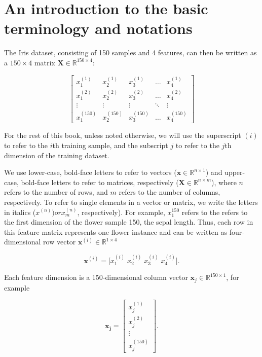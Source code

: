 \documentclass[letterpaper]{report}
\begin{document}
\section{An introduction to the basic terminology and notations}

\newpage

The Iris dataset, consisting of 150 samples and 4 features, can then be written as a $150 \times 4$ matrix $\mathbf{X} \in \mathbb{R}^{150 \times 4}:$

\[
\begin{bmatrix}
    x_{1}^{(1)} & x_{2}^{(1)} & x_{3}^{(1)} & \dots  & x_{4}^{(1)} \\
    x_{1}^{(2)} & x_{2}^{(2)} & x_{3}^{(2)} & \dots  & x_{4}^{(2)} \\
    \vdots & \vdots & \vdots & \ddots & \vdots \\
    x_{1}^{(150)} & x_{2}^{(150)} & x_{3}^{(150)} & \dots  & x_{4}^{(150)}
\end{bmatrix}
\]

For the rest of this book, unless noted otherwise, we will use the superscript $(i)$ to refer to the $i$th training sample, and the subscript $j$ to refer to the $j$th dimension of the training dataset. 

We use lower-case, bold-face letters to refer to vectors ($\mathbf{x} \in \mathbb{R}^{n \times 1}$) and upper-case, bold-face letters to refer to matrices, respectively ($\mathbf{X} \in \mathbb{R}^{n \times m}$), where $n$ refers to the number of rows, and $m$ refers to the number of columns, respectively. To refer to single elements in a vector or matrix, we write the letters in italics ($x^{(n)}) or x^{(n)}_{m}$, respectively). For example, $x^{150}_1$ refers to the refers to the first dimension of the flower sample 150, the sepal length. Thus, each row in this feature matrix represents one flower instance and can be written as four-dimensional row vector $\mathbf{x}^{(i)} \in \mathbb{R}^{1 \times 4}$

\[ \mathbf{x}^{(i)} = \bigg[x^{(i)}_1 \; x^{(i)}_2 \; x^{(i)}_3 \; x^{(i)}_4 \bigg]. \]

Each feature dimension is a 150-dimensional column vector $\mathbf{x}_{j} \in \mathbb{R}^{150 \times 1}$, for example

\[
\mathbf{x_j} = \begin{bmatrix}
    x_{j}^{(1)}  \\
    x_{j}^{(2)}  \\
    \vdots  \\
    x_{j}^{(150)}
\end{bmatrix}
.\]
\end{document}
